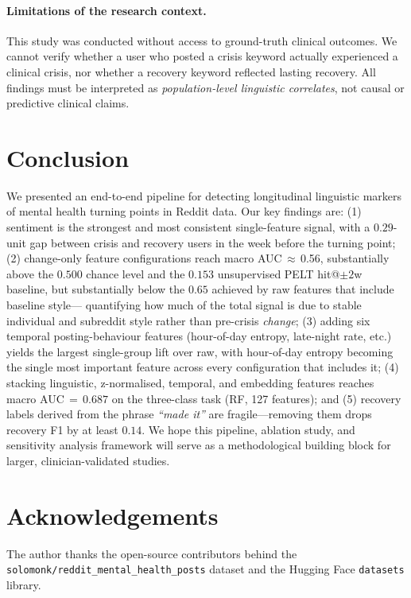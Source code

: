 \documentclass[11pt]{article}
\begin{document}
\paragraph{Limitations of the research context.}
This study was conducted without access to ground-truth clinical
outcomes. We cannot verify whether a user who posted a crisis keyword
actually experienced a clinical crisis, nor whether a recovery keyword
reflected lasting recovery. All findings must be interpreted as
\emph{population-level linguistic correlates}, not causal or predictive
clinical claims.

\section{Conclusion}
\label{sec:conclusion}

We presented an end-to-end pipeline for detecting longitudinal
linguistic markers of mental health turning points in Reddit data.
Our key findings are: (1) sentiment is the strongest and most
consistent single-feature signal, with a $0.29$-unit gap between
crisis and recovery users in the week before the turning point;
(2) change-only feature configurations reach macro AUC\,$\approx$\,0.56,
substantially above the $0.500$ chance level and the $0.153$
unsupervised PELT hit@$\pm 2$w baseline, but substantially below the
$0.65$ achieved by raw features that include baseline style---
quantifying how much of the total signal is due to stable individual
and subreddit style rather than pre-crisis \emph{change};
(3) adding six temporal posting-behaviour features (hour-of-day
entropy, late-night rate, etc.) yields the largest single-group lift
over raw, with hour-of-day entropy becoming the single most
important feature across every configuration that includes it;
(4) stacking linguistic, z-normalised, temporal, and embedding
features reaches macro AUC\,$=$\,$0.687$ on the three-class task
(RF, 127 features); and (5) recovery labels derived from the phrase
\emph{``made it''} are fragile---removing them drops recovery F1
by at least $0.14$.
We hope this pipeline, ablation study, and sensitivity analysis
framework will serve as a methodological building block for larger,
clinician-validated studies.

\section*{Acknowledgements}
The author thanks the open-source contributors behind the
\texttt{solomonk/reddit\_mental\_health\_posts} dataset and the
Hugging Face \texttt{datasets} library.



\end{document}
